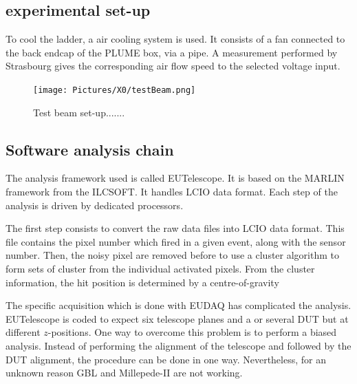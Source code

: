     \subsection{experimental set-up}


    To cool the ladder, a air cooling system is used. 
    It consists of a fan connected to the back endcap of the PLUME box, via a pipe. 
    A measurement performed by Strasbourg gives the corresponding air flow speed to the selected voltage input.  

    \begin{figure}
      \centering
      \texttt{[image: Pictures/X0/testBeam.png]}
      \caption{Test beam set-up.......}
      \label{fig:testBeam}
    \end{figure}

    \subsection{Software analysis chain}

    The analysis framework used is called EUTelescope.
    It is based on the MARLIN framework from the ILCSOFT.
    It handles LCIO data format.
    Each step of the analysis is driven by dedicated processors.

    The first step consists to convert the raw data files into LCIO data format.
    This file contains the pixel number which fired in a given event, along with the sensor number.
    Then, the noisy pixel are removed before to use a cluster algorithm to form sets of cluster from the individual activated pixels.
    From the cluster information, the hit position is determined by a centre-of-gravity 

    The specific acquisition which is done with EUDAQ has complicated the analysis.
    EUTelescope is coded to expect six telescope planes and a or several \gls{DUT} but at different $z$-positions.
    One way to overcome this problem is to perform a biased analysis. 
    Instead of performing the alignment of the telescope and followed by the \gls{DUT} alignment, the procedure can be done in one way.
    Nevertheless, for an unknown reason GBL and Millepede-II are not working.

